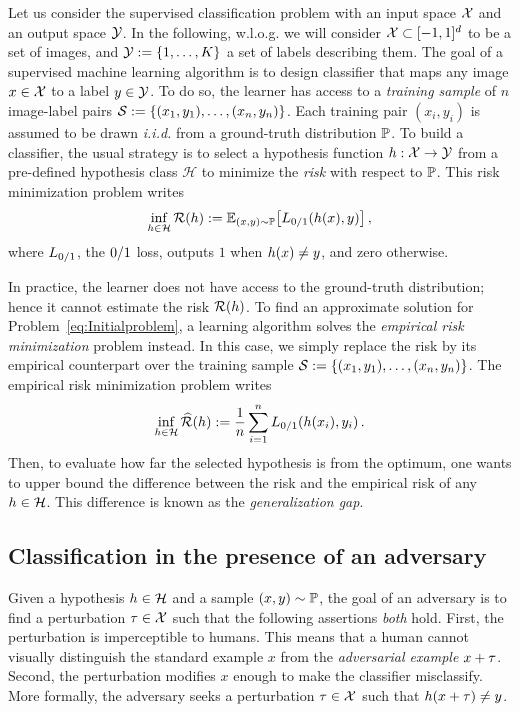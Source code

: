 Let us consider the supervised classification problem with an input space $\mathcal{X}$ and an output space $\mathcal{Y}$. In the following, w.l.o.g. we will consider $\mathcal{X} \subset [-1,1]^d$ to be a set of images, and $\mathcal{Y}:= \{1,\dots,K\}$ a set of labels describing them. The goal of a supervised machine learning algorithm is to design classifier that maps any image $x  \in \mathcal{X}$ to a label $y \in \mathcal{Y}$. To do so, the learner has access to a \emph{training sample} of $n$ image-label pairs $\mathcal{S}:=\{({x_1},y_1),\dots ,({x_n},y_n)\}$. Each training pair $({x_i},y_i)$ is assumed to be drawn \emph{i.i.d.} from a ground-truth distribution $\mathbb{P}$. To build a classifier, the usual strategy is to select a hypothesis function ${h}: \mathcal{X} \rightarrow \mathcal{Y}$ from a pre-defined hypothesis class $\mathcal{H}$ to minimize the \emph{risk} with respect to $\mathbb{P}$. This risk minimization problem writes  
\begin{equation}
\label{eq:Initialproblem}
\inf_{\hypothesis \in \mathcal{H}} \risk(\hypothesis)  := \mathbb{E}_{(x ,y) \sim \PP}\left[ \zerooneloss\left(\hypothesis(x ), y\right)\right] \equationspace,
\end{equation}
where $L_{0/1}$, the $0/1$ loss, outputs $1$ when ${h}(x ) \neq y$, and zero otherwise. 

In practice, the learner does not have access to the ground-truth distribution; hence it cannot estimate the risk $\mathcal{R}({h})$. To find an approximate solution for Problem~\eqref{eq:Initialproblem}, a learning algorithm solves the \emph{empirical risk minimization} problem instead. In this case, we simply replace the risk by its empirical counterpart over the training sample $\mathcal{S}:=\{({x_1},y_1),\dots ,({x_n},y_n)\}$. The empirical risk minimization problem writes
\begin{equation}
\inf_{\hypothesis \in \mathcal{H}} \widehat{\risk}(\hypothesis) := \frac1n \sum_{i=1}^{n} \zerooneloss\left(\hypothesis({x_i}), y_i\right)\equationspace.\label{eq:EmpInitialproblem}
\end{equation}
Then, to evaluate how far the selected hypothesis is from the optimum, one wants to upper bound the difference between the risk and the empirical risk of any ${h} \in \mathcal{H}$. This difference is known as the \emph{generalization gap}. 

\subsection{Classification in the presence of an adversary}
Given a hypothesis ${h} \in \mathcal{H}$ and a sample $(x ,y) \sim \mathbb{P}$, the goal of an adversary is to find a perturbation ${\tau} \in \mathcal{X}$ such that the following assertions \emph{both} hold. First, the perturbation is imperceptible to humans. This means that a human cannot visually distinguish the standard example $x $ from the \emph{adversarial example} $x  + {\tau}$. Second, the perturbation modifies $x $ enough to make the classifier misclassify. More formally, the adversary seeks a perturbation ${\tau} \in \mathcal{X}$ such that ${h}(x +{\tau}) \neq y$.

